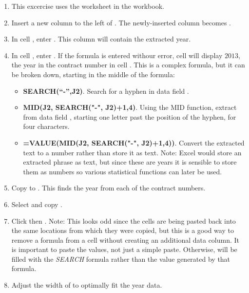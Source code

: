 \begin{enumerate}
	\item This excercise uses the  worksheet in the  workbook.
	\item Insert a new column to the left of . The newly-inserted column becomes .
	\item In cell , enter . This column will contain the extracted year.
	\item In cell , enter . If the formula is entered withour error, cell  will display $ 2013 $, the year in the contract number in cell . This is a complex formula, but it can be broken down, starting in the middle of the formula: 
	
	\begin{itemize}
		\item \textbf{SEARCH(``-'',J2)}. Search for a hyphen in data field .
		\item \textbf{MID(J2, SEARCH("-", J2)+1,4)}. Using the MID function, extract from data field , starting one letter past the position of the hyphen, for four characters.
		\item \textbf{=VALUE(MID(J2, SEARCH("-", J2)+1,4))}. Convert the extracted text to a number rather than store it as text. Note: Excel would store an extracted phrase as text, but since these are years it is sensible to store them as numbers so various statistical functions can later be used.
	\end{itemize}

	\item Copy  to . This finds the year from each of the contract numbers.
	\item Select and copy .
	\item Click  then . Note: This looks odd since the cells are being pasted back into the same locations from which they were copied, but this is a good way to remove a formula from a cell without creating an additional data column. It is important to paste the values, not just a simple paste. Otherwise,  will be filled with the \textit{SEARCH} formula rather than the value generated by that formula.
	\item Adjust the width of  to optimally fit the year data.
	

\end{enumerate}
